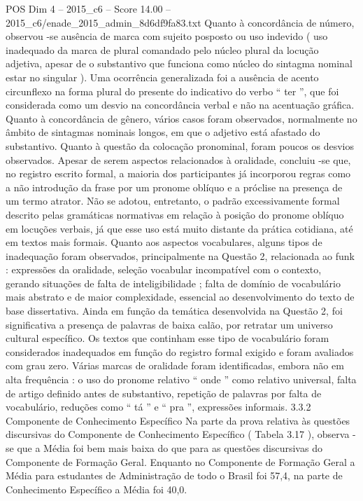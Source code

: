\begin{textsample}{POS Dim 4 – 2015\_c6 – Score 14.00 – 2015\_c6/enade\_2015\_admin\_8d6df9fa83.txt}
Quanto à concordância de número, observou -se ausência de marca com sujeito posposto ou uso indevido ( uso inadequado da marca de plural comandado pelo núcleo plural da locução adjetiva, apesar de o substantivo que funciona como núcleo do sintagma nominal estar no singular ).
Uma ocorrência generalizada foi a ausência de acento circunflexo na forma plural do presente do indicativo do verbo “ ter ”, que foi considerada como um desvio na concordância verbal e não na acentuação gráfica.
Quanto à concordância de gênero, vários casos foram observados, normalmente no âmbito de sintagmas nominais longos, em que o adjetivo está afastado do substantivo.
Quanto à questão da colocação pronominal, foram poucos os desvios observados.
Apesar de serem aspectos relacionados à oralidade, concluiu -se que, no registro escrito formal, a maioria dos participantes já incorporou regras como a não introdução da frase por um pronome oblíquo e a próclise na presença de um termo atrator.
Não se adotou, entretanto, o padrão excessivamente formal descrito pelas gramáticas normativas em relação à posição do pronome oblíquo em locuções verbais, já que esse uso está muito distante da prática cotidiana, até em textos mais formais.
Quanto aos aspectos vocabulares, alguns tipos de inadequação foram observados, principalmente na Questão 2, relacionada ao funk : expressões da oralidade, seleção vocabular incompatível com o contexto, gerando situações de falta de inteligibilidade ; falta de domínio de vocabulário mais abstrato e de maior complexidade, essencial ao desenvolvimento do texto de base dissertativa.
Ainda em função da temática desenvolvida na Questão 2, foi significativa a presença de palavras de baixa calão, por retratar um universo cultural específico.
Os textos que continham esse tipo de vocabulário foram considerados inadequados em função do registro formal exigido e foram avaliados com grau zero.
Várias marcas de oralidade foram identificadas, embora não em alta frequência : o uso do pronome relativo “ onde ” como relativo universal, falta de artigo definido antes de substantivo, repetição de palavras por falta de vocabulário, reduções como “ tá ” e “ pra ”, expressões informais. 3.3.2 Componente de Conhecimento Específico Na parte da prova relativa às questões discursivas do Componente de Conhecimento Específico ( Tabela 3.17 ), observa -se que a Média foi bem mais baixa do que para as questões discursivas do Componente de Formação Geral.
Enquanto no Componente de Formação Geral a Média para estudantes de Administração de todo o Brasil foi 57,4, na parte de Conhecimento Específico a Média foi 40,0.

\end{textsample}
